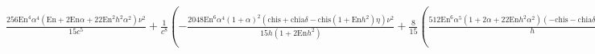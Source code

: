 \documentclass{article}
\begin{document}
\begin{doublespace}
\noindent\(\frac{256 \text{En}^4 \alpha ^4 \left(\text{En}+2 \text{En} \alpha +22 \text{En}^2 h^2 \alpha ^2\right) \nu ^2}{15 c^5}+\frac{1}{c^8}\left(-\frac{2048
\text{En}^6 \alpha ^4 (1+\alpha )^2 \left(\text{chis}+\text{chia} \delta -\text{chis} \left(1+\text{En} h^2\right) \eta \right) \nu ^2}{15 h \left(1+2
\text{En} h^2\right)}+\frac{8}{15} \left(\frac{512 \text{En}^6 \alpha ^5 \left(1+2 \alpha +22 \text{En} h^2 \alpha ^2\right) (-\text{chis}-\text{chia}
\delta +\text{chis} \eta ) \nu ^2}{h}+16 \text{En}^4 \alpha ^4 \nu ^2 \left(-16 \text{En}^{3/2} \sqrt{\text{En} h^2} \alpha ^2 \left(-4 \text{En}-10
\text{En} \alpha +51 \text{En}^2 h^2 \alpha ^2\right) \delta  (-\text{chia}+\text{chis} \delta )+\frac{176 \text{En}^2 \alpha ^2 \left(-1+\frac{(1+\alpha
)^2}{\left(1+2 \text{En} h^2\right) \alpha ^2}\right) \left(-\text{chis}-\text{chia} \delta +\text{chis} \eta +\text{chis} \text{En} h^2 \eta \right)}{h}+12
\left(-32 \text{En}^3 h \alpha ^3 (-\text{chis}-\text{chia} \delta +\text{chis} \eta )-\frac{16 \text{En}^2 \alpha ^2 \left(-1+\frac{(1+\alpha )^2}{\left(1+2
\text{En} h^2\right) \alpha ^2}\right) \left(-\text{chis}-\text{chia} \delta +\text{chis} \eta +\text{chis} \text{En} h^2 \eta \right)}{h}+\frac{16
\text{En}^2 \alpha ^2 \left(-2 \text{chis} \text{En} h^2 \alpha -2 \text{chia} \text{En} h^2 \alpha  \delta -\text{chis} \eta -\text{chis} \text{En}
h^2 \eta +2 \text{chis} \text{En} h^2 \alpha  \eta \right)}{h}\right)-16 \text{En}^{3/2} \sqrt{\text{En} h^2} \alpha ^2 \left(\text{En}+6 \text{En}
\alpha +78 \text{En}^2 h^2 \alpha ^2\right) (\text{chis}+\text{chia} \delta -2 \text{chis} \nu )\right)\right)\right)+O\left[\frac{1}{c}\right]^9\)
\end{doublespace}
\end{document}

